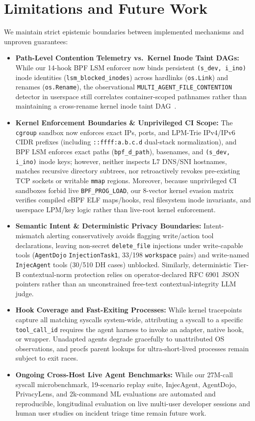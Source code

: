 \documentclass[10pt,twocolumn,letterpaper]{article}
\newcommand{\code}[1]{\texttt{\small #1}}
\begin{document}
\section{Limitations and Future Work}
\label{sec:discussion}

We maintain strict epistemic boundaries between implemented mechanisms and unproven guarantees:
\begin{itemize}
  \item \textbf{Path-Level Contention Telemetry vs.\ Kernel Inode Taint DAGs:} While our 14-hook BPF LSM enforcer now binds persistent \code{(s\_dev, i\_ino)} inode identities (\code{lsm\_blocked\_inodes}) across hardlinks (\code{os.Link}) and renames (\code{os.Rename}), the observational \code{MULTI\_AGENT\_FILE\_CONTENTION} detector in userspace still correlates container-scoped pathnames rather than maintaining a cross-rename kernel inode taint DAG~\cite{agentwarden2026}.
  \item \textbf{Kernel Enforcement Boundaries \& Unprivileged CI Scope:} The \code{cgroup} sandbox now enforces exact IPs, ports, and LPM-Trie IPv4/IPv6 CIDR prefixes (including \code{::ffff:a.b.c.d} dual-stack normalization), and BPF LSM enforces exact paths (\code{bpf\_d\_path}), basenames, and \code{(s\_dev, i\_ino)} inode keys; however, neither inspects L7 DNS/SNI hostnames, matches recursive directory subtrees, nor retroactively revokes pre-existing TCP sockets or writable \code{mmap} regions. Moreover, because unprivileged CI sandboxes forbid live \code{BPF\_PROG\_LOAD}, our 8-vector kernel evasion matrix verifies compiled eBPF ELF maps/hooks, real filesystem inode invariants, and userspace LPM/key logic rather than live-root kernel enforcement.
  \item \textbf{Semantic Intent \& Deterministic Privacy Boundaries:} Intent-mismatch alerting conservatively avoids flagging write/action tool declarations, leaving non-secret \code{delete\_file} injections under write-capable tools (\code{AgentDojo} \code{InjectionTask1}, 33/198 \code{workspace} pairs) and write-named \code{InjecAgent} tools (30/510 DH cases) unblocked. Similarly, deterministic Tier-B contextual-norm protection relies on operator-declared RFC 6901 JSON pointers rather than an unconstrained free-text contextual-integrity LLM judge.
  \item \textbf{Hook Coverage and Fast-Exiting Processes:} While kernel tracepoints capture all matching syscalls system-wide, attributing a syscall to a specific \code{tool\_call\_id} requires the agent harness to invoke an adapter, native hook, or wrapper. Unadapted agents degrade gracefully to unattributed OS observations, and procfs parent lookups for ultra-short-lived processes remain subject to exit races.
  \item \textbf{Ongoing Cross-Host Live Agent Benchmarks:} While our 27M-call syscall microbenchmark, 19-scenario replay suite, InjecAgent, AgentDojo, PrivacyLens, and 2k-command ML evaluations are automated and reproducible, longitudinal evaluation on live multi-user developer sessions and human user studies on incident triage time remain future work.
\end{itemize}
\end{document}
